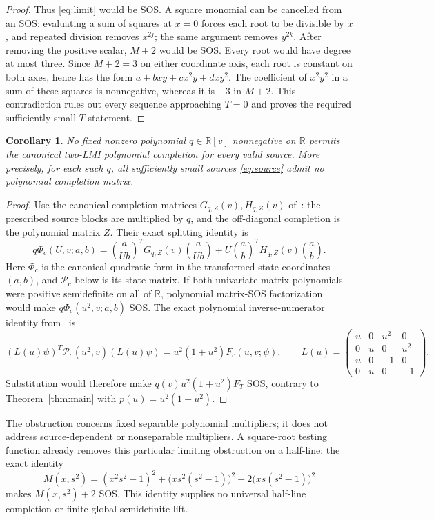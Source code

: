 \documentclass[11pt]{article}
\newtheorem{corollary}[theorem]{Corollary}
\newcommand{\R}{\mathbb R}
\begin{document}
\begin{proof}
Thus \eqref{eq:limit} would be SOS. A square monomial can be cancelled
from an SOS: evaluating a sum of squares at $x=0$ forces each root
to be divisible by $x$, and repeated division removes $x^{2j}$;
the same argument removes $y^{2k}$. After removing the positive scalar,
$M+2$ would be SOS. Every root would have degree at most three.
Since $M+2=3$ on either coordinate axis, each root is constant on
both axes, hence has the form
$a+bxy+cx^2y+dxy^2$. The coefficient of $x^2y^2$ in a sum of these
squares is nonnegative, whereas it is $-3$ in $M+2$.
This contradiction rules out every sequence approaching $T=0$ and
proves the required sufficiently-small-$T$ statement.
\end{proof}

\begin{corollary}\label{cor:completion}
No fixed nonzero polynomial $q\in\R[v]$ nonnegative on $\R$ permits
the canonical two-LMI polynomial completion for every valid source.
More precisely, for each such $q$, all sufficiently small sources
\eqref{eq:source} admit no polynomial completion matrix.
\end{corollary}
\begin{proof}
Use the canonical completion matrices $G_{q,Z}(v),H_{q,Z}(v)$
of~\cite[Sections 1 and 4]{Canonical}: the prescribed source blocks
are multiplied by $q$, and the off-diagonal completion is the
polynomial matrix $Z$. Their exact splitting identity is
\[
 q\Phi_c(U,v;a,b)=
 \binom a{Ub}^{\!T}G_{q,Z}(v)\binom a{Ub}
 +U\binom ab^{\!T}H_{q,Z}(v)\binom ab.
\]
Here $\Phi_c$ is the canonical quadratic form in the transformed
state coordinates $(a,b)$, and $\mathcal P_c$ below is its state matrix.
If both univariate matrix polynomials were positive semidefinite
on all of $\R$, polynomial matrix-SOS factorization~\cite[Theorem 1.2]{Zalar}
would make $q\Phi_c(u^2,v;a,b)$ SOS. The exact polynomial inverse-numerator identity
from~\cite[Section 1]{Canonical} is
\[
 (L(u)\psi)^T\mathcal P_c(u^2,v)(L(u)\psi)
 =u^2(1+u^2)F_c(u,v;\psi),\qquad
 L(u)=\begin{pmatrix}
 u&0&u^2&0\\0&u&0&u^2\\u&0&-1&0\\0&u&0&-1
 \end{pmatrix}.
\]
Substitution would therefore make $q(v)u^2(1+u^2)F_T$ SOS, contrary
to Theorem~\ref{thm:main} with $p(u)=u^2(1+u^2)$.
\end{proof}

The obstruction concerns fixed separable polynomial multipliers;
it does not address source-dependent or nonseparable multipliers.
A square-root testing function already removes this particular limiting
obstruction on a half-line: the exact identity
\[
 M(x,s^2)=(x^2s^2-1)^2
 +\bigl(xs^2(s^2-1)\bigr)^2
 +2\bigl(xs(s^2-1)\bigr)^2
\]
makes $M(x,s^2)+2$ SOS. This identity supplies no universal half-line
completion or finite global semidefinite lift.
\end{document}
